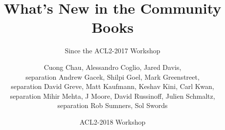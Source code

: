 \documentclass{beamer}
\newcommand{\code}[1]{\texttt{#1}}
\newcommand{\bookpath}[1]{\textbf{\code{#1}}}
\newcommand{\newlibtitle}{\frametitle{New Libraries}}
\newcommand{\implibtitle}{\frametitle{Improved Libraries}}
\newcommand{\separation}{\vspace*{1ex}}
\begin{document}

\title{What's New in the Community Books}

\subtitle{Since the ACL2-2017 Workshop}

\author{Cuong Chau,
        Alessandro Coglio,
        Jared Davis,
        \\separation
        Andrew Gacek,
        Shilpi Goel,
        Mark Greenstreet,
        \\separation
        David Greve,
        Matt Kaufmann,
        Keshav Kini,
        Carl Kwan,
        \\separation
        Mihir Mehta,
        J Moore,
        David Russinoff,
        Julien Schmaltz,
        \\separation
        Rob Sumners,
        Sol Swords}


\date{ACL2-2018 Workshop}






\end{document}
